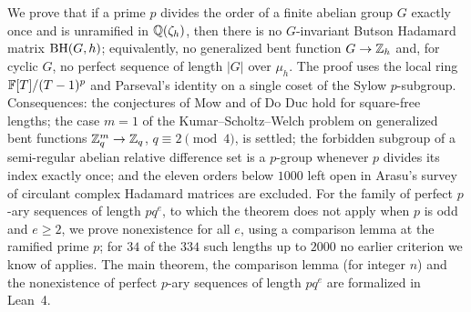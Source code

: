 We prove that if a prime $p$ divides the order of a finite abelian group
$G$ exactly once and is unramified in $\mathbb{Q}(\zeta_h)$, then there is no
$G$-invariant Butson Hadamard matrix $\operatorname{BH}(G,h)$; equivalently, no
generalized bent function $G\to\mathbb{Z}_h$ and, for cyclic $G$, no perfect
sequence of length $|G|$ over $\mu_h$. The proof uses the local ring
$\mathbb{F}[T]/(T-1)^p$ and Parseval's identity on a single coset of the Sylow
$p$-subgroup. Consequences: the conjectures of Mow and of Do Duc hold
for square-free lengths; the case $m=1$ of the Kumar--Scholtz--Welch
problem on generalized bent functions $\mathbb{Z}_q^m\to\mathbb{Z}_q$, $q\equiv2\pmod4$,
is settled; the forbidden subgroup of a semi-regular abelian relative
difference set is a $p$-group whenever $p$ divides its index exactly
once; and the eleven orders below $1000$ left open in Arasu's survey of
circulant complex Hadamard matrices are excluded. For the family of
perfect $p$-ary sequences of length $pq^e$, to which the theorem does not
apply when $p$ is odd and $e\ge2$, we prove nonexistence for all $e$,
using a comparison lemma at the ramified prime $p$; for $34$ of the
$334$ such lengths up to $2000$ no earlier criterion we know of applies.
The main theorem, the comparison lemma (for integer $n$) and the nonexistence of perfect
$p$-ary sequences of length $pq^e$ are formalized in Lean~4.
